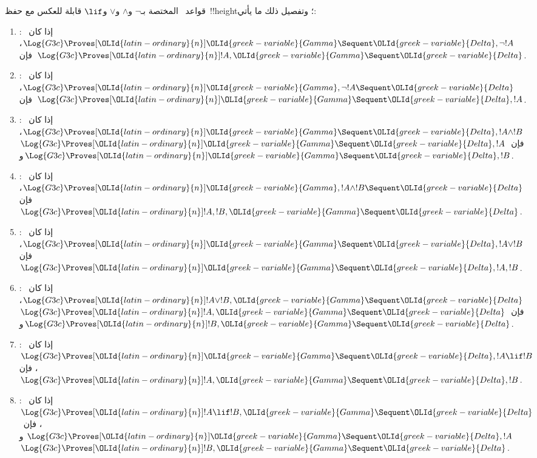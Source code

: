 \documentclass[../../../include/open-logic-section]{subfiles}
\begin{document}
\begin{lem}
قواعد~ المختصة بـ$\lnot$ و$\land$ و$\lor$ و$\lif$ قابلة للعكس
مع حفظ~!!{height}؛ وتفصيل ذلك ما يأتي:
\begin{enumerate}
  \item \RightR{\lnot}: إذا كان~$\Log{G3c} \Proves[\OLId{latin-ordinary}{n}] \OLId{greek-variable}{Gamma} \Sequent
  \OLId{greek-variable}{Delta}, \lnot !A$، فإن~$\Log{G3c} \Proves[\OLId{latin-ordinary}{n}] !A, \OLId{greek-variable}{Gamma} \Sequent
  \OLId{greek-variable}{Delta}$.
  \item \LeftR{\lnot}: إذا كان~$\Log{G3c} \Proves[\OLId{latin-ordinary}{n}] \OLId{greek-variable}{Gamma}, \lnot !A
  \Sequent \OLId{greek-variable}{Delta}$، فإن~$\Log{G3c} \Proves[\OLId{latin-ordinary}{n}] \OLId{greek-variable}{Gamma} \Sequent \OLId{greek-variable}{Delta},
  !A$.
  \item \RightR{\land}: إذا كان~$\Log{G3c} \Proves[\OLId{latin-ordinary}{n}] \OLId{greek-variable}{Gamma} \Sequent
  \OLId{greek-variable}{Delta}, !A \land !B$، فإن~$\Log{G3c} \Proves[\OLId{latin-ordinary}{n}] \OLId{greek-variable}{Gamma} \Sequent
  \OLId{greek-variable}{Delta}, !A$ و$\Log{G3c} \Proves[\OLId{latin-ordinary}{n}] \OLId{greek-variable}{Gamma} \Sequent
  \OLId{greek-variable}{Delta}, !B$.
  \item \LeftR{\land}: إذا كان~$\Log{G3c} \Proves[\OLId{latin-ordinary}{n}] \OLId{greek-variable}{Gamma}, !A \land !B
  \Sequent \OLId{greek-variable}{Delta}$، فإن~$\Log{G3c} \Proves[\OLId{latin-ordinary}{n}] !A, !B, \OLId{greek-variable}{Gamma} \Sequent
  \OLId{greek-variable}{Delta}$.
  \item \RightR{\lor}: إذا كان~$\Log{G3c} \Proves[\OLId{latin-ordinary}{n}] \OLId{greek-variable}{Gamma} \Sequent
  \OLId{greek-variable}{Delta}, !A \lor !B$، فإن~$\Log{G3c} \Proves[\OLId{latin-ordinary}{n}] \OLId{greek-variable}{Gamma} \Sequent
  \OLId{greek-variable}{Delta}, !A, !B$.
  \item \LeftR{\lor}: إذا كان~$\Log{G3c} \Proves[\OLId{latin-ordinary}{n}] !A \lor !B, \OLId{greek-variable}{Gamma} \Sequent
  \OLId{greek-variable}{Delta}$، فإن~$\Log{G3c} \Proves[\OLId{latin-ordinary}{n}] !A, \OLId{greek-variable}{Gamma} \Sequent
  \OLId{greek-variable}{Delta}$ و$\Log{G3c} \Proves[\OLId{latin-ordinary}{n}] !B, \OLId{greek-variable}{Gamma} \Sequent
  \OLId{greek-variable}{Delta}$.
  \item \RightR{\lif}: إذا كان~$\Log{G3c} \Proves[\OLId{latin-ordinary}{n}] \OLId{greek-variable}{Gamma} \Sequent
  \OLId{greek-variable}{Delta}, !A \lif !B$، فإن~$\Log{G3c} \Proves[\OLId{latin-ordinary}{n}] !A, \OLId{greek-variable}{Gamma} \Sequent
  \OLId{greek-variable}{Delta}, !B$.
  \item \LeftR{\lif}: إذا كان~$\Log{G3c} \Proves[\OLId{latin-ordinary}{n}] !A \lif !B, \OLId{greek-variable}{Gamma}
  \Sequent \OLId{greek-variable}{Delta}$، فإن~$\Log{G3c} \Proves[\OLId{latin-ordinary}{n}] \OLId{greek-variable}{Gamma} \Sequent \OLId{greek-variable}{Delta},
  !A$ و$\Log{G3c} \Proves[\OLId{latin-ordinary}{n}] !B, \OLId{greek-variable}{Gamma} \Sequent \OLId{greek-variable}{Delta}$.
\end{enumerate}
\end{lem}
\end{document}
